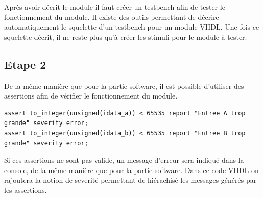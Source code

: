 \documentclass[a4paper]{article}
\begin{document}
        Après avoir décrit le module il faut créer un testbench afin de tester le fonctionnement du module.
        Il existe des outils permettant de décrire automatiquement le squelette d'un testbench pour un module VHDL.
        Une fois ce squelette décrit, il ne reste plus qu'à créer les stimuli pour le module à tester.

    \subsection{Etape 2}
        De la même manière que pour la partie software, il est possible d'utiliser des assertions afin de vérifier le fonctionnement du module.
\begin{lstlisting}[style=VHDL]
assert to_integer(unsigned(idata_a)) < 65535 report "Entree A trop grande" severity error;
assert to_integer(unsigned(idata_b)) < 65535 report "Entree B trop grande" severity error;
\end{lstlisting}
        Si ces assertions ne sont pas valide, un message d'erreur sera indiqué dans la console, de la même manière que pour la partie software. 
        Dans ce code VHDL on rajoutera la notion de severité permettant de hiérachisé les messages générés par les assertions.
\end{document}
